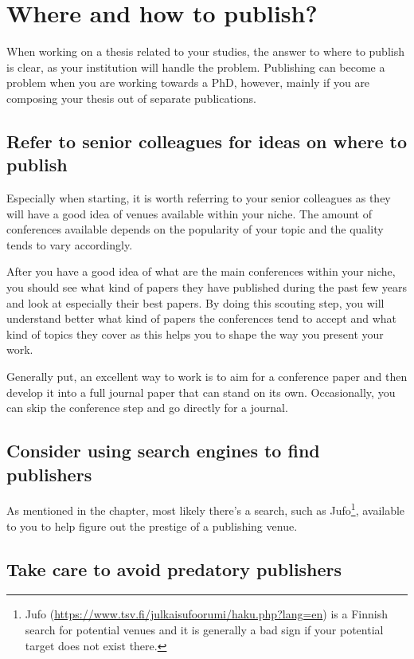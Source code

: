\section{Where and how to publish?}

When working on a thesis related to your studies, the answer to where to publish is clear, as your institution will handle the problem.
Publishing can become a problem when you are working towards a PhD, however, mainly if you are composing your thesis out of separate publications.

\subsection{Refer to senior colleagues for ideas on where to publish}

Especially when starting, it is worth referring to your senior colleagues as they will have a good idea of venues available within your niche.
The amount of conferences available depends on the popularity of your topic and the quality tends to vary accordingly.

After you have a good idea of what are the main conferences within your niche, you should see what kind of papers they have published during the past few years and look at especially their best papers.
By doing this scouting step, you will understand better what kind of papers the conferences tend to accept and what kind of topics they cover as this helps you to shape the way you present your work.

Generally put, an excellent way to work is to aim for a conference paper and then develop it into a full journal paper that can stand on its own.
Occasionally, you can skip the conference step and go directly for a journal.

\subsection{Consider using search engines to find publishers}

As mentioned in the  chapter, most likely there's a search, such as Jufo\footnote{Jufo (\url{https://www.tsv.fi/julkaisufoorumi/haku.php?lang=en}) is a Finnish search for potential venues and it is generally a bad sign if your potential target does not exist there.}, available to you to help figure out the prestige of a publishing venue.

\subsection{Take care to avoid predatory publishers}

